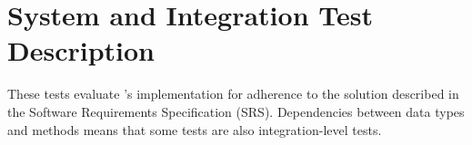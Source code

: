 \section{System and Integration Test Description}\label{siutp_SystemTests}
These tests evaluate \progname{}'s implementation for adherence to the solution
described in the Software Requirements Specification (SRS). Dependencies
between data types and methods means that some tests are also integration-level
tests.



\clearpage



\clearpage

